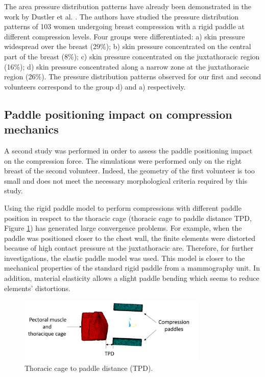The area pressure distribution patterns have already been demonstrated in the work by Dustler et al. \citep{dustler_breast_2012}. The authors have studied the pressure distribution patterns of 103 women undergoing breast compression with a rigid paddle at different compression levels. Four groups were differentiated: a) skin pressure widespread over the breast (29\%); b) skin pressure concentrated on the central part of the breast (8\%); c) skin pressure concentrated on the juxtathoracic region (16\%); d) skin pressure concentrated along a narrow zone at the juxtathoracic region (26\%).  The pressure distribution patterns observed for our first and second volunteers correspond to the group d) and a) respectively.


\clearpage
\subsection{Paddle positioning impact on compression mechanics}\label{subsection:breastpositioning}

A second study was performed in order to assess the paddle positioning impact on the compression force. The simulations were performed only on the right breast of the second volunteer. Indeed, the geometry of the first volunteer is too small and does not meet the necessary morphological criteria required by this study. 

Using the rigid paddle model to perform compressions with different paddle position in respect to the thoracic cage (thoracic cage to paddle distance TPD, Figure \ref{fig:elasticpaddle}) has generated large convergence problems. For example, when the paddle was positioned closer to the chest wall, the finite elements were distorted because of high contact pressure at the juxtathoracic are. Therefore, for further investigations, the elastic paddle model was used. This model is closer to the mechanical properties of the standard rigid paddle from a mammography unit.  In addition, material elasticity allows a slight paddle bending which seems to reduce elements' distortions. 

\begin{figure}[!h]
\centering
\includegraphics[width=0.8\textwidth,keepaspectratio]{figures/TPdistance.png} 
\caption{Thoracic cage to paddle distance (TPD).}\label{fig:elasticpaddle}
\end{figure}

